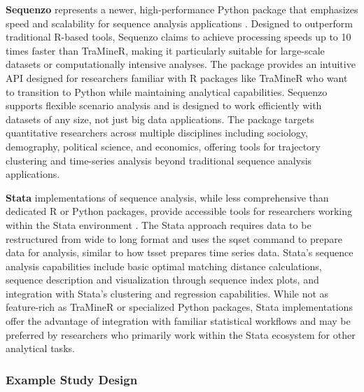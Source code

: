 \documentclass[../main.tex]{subfiles}
\begin{document}
\textbf{Sequenzo} represents a newer, high-performance Python package that emphasizes speed and scalability for sequence analysis applications \citep{sequenzo_github}. Designed to outperform traditional R-based tools, Sequenzo claims to achieve processing speeds up to 10 times faster than TraMineR, making it particularly suitable for large-scale datasets or computationally intensive analyses. The package provides an intuitive API designed for researchers familiar with R packages like TraMineR who want to transition to Python while maintaining analytical capabilities. Sequenzo supports flexible scenario analysis and is designed to work efficiently with datasets of any size, not just big data applications. The package targets quantitative researchers across multiple disciplines including sociology, demography, political science, and economics, offering tools for trajectory clustering and time-series analysis beyond traditional sequence analysis applications.


\textbf{Stata} implementations of sequence analysis, while less comprehensive than dedicated R or Python packages, provide accessible tools for researchers working within the Stata environment \citep{stata_sequence_analysis, stata_sequence_german}. The Stata approach requires data to be restructured from wide to long format and uses the sqset command to prepare data for analysis, similar to how tsset prepares time series data. Stata's sequence analysis capabilities include basic optimal matching distance calculations, sequence description and visualization through sequence index plots, and integration with Stata's clustering and regression capabilities. While not as feature-rich as TraMineR or specialized Python packages, Stata implementations offer the advantage of integration with familiar statistical workflows and may be preferred by researchers who primarily work within the Stata ecosystem for other analytical tasks.

\subsubsection{Example Study Design}

\end{document}
